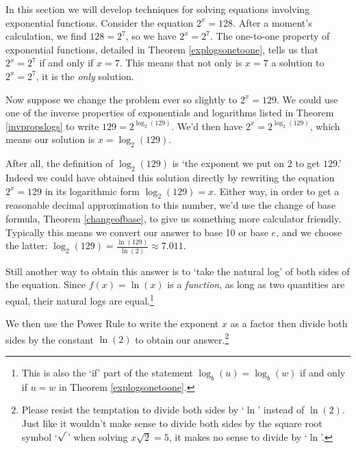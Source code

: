 

\setcounter{footnote}{0}

\label{ExponentialEquationsandInequalities}

In this section we will develop techniques for solving equations involving exponential functions.  Consider the equation $2^{x} = 128$.  After a moment's calculation, we find $128 = 2^{7}$, so we have $2^{x} = 2^{7}$.  The one-to-one property of exponential functions, detailed in Theorem \ref{explogsonetoone}, tells us that $2^{x} = 2^{7}$ if and only if $x=7$.  This means that not only is $x=7$ a solution to $2^{x} = 2^{7}$, it is the \textit{only} solution.  

\smallskip

Now suppose we change the problem ever so slightly to $2^{x} = 129$.  We could use one of the inverse properties of exponentials and logarithms listed in Theorem \ref{invpropslogs} to write $129 = 2^{\log_{2}(129)}$.  We'd then have $2^{x} = 2^{\log_{2}(129)}$, which means our solution is $x = \log_{2}(129)$. 

\smallskip

After all, the definition of $\log_{2}(129)$ is `the exponent we put on $2$ to get $129$.' Indeed we could have obtained this solution directly by rewriting the equation $2^{x} = 129$ in its logarithmic form $\log_{2}(129) = x$.  Either way, in order to get a reasonable decimal approximation to this number, we'd use the change of base formula, Theorem \ref{changeofbase}, to give us something more calculator friendly.  Typically this means we convert our answer to base 10 or base $e$, and we choose the latter: $\log_{2}(129) = \frac{\ln(129)}{\ln(2)} \approx 7.011$.  

\smallskip

Still another way to obtain this answer is to `take the natural log' of both sides of the equation. Since $f(x) = \ln(x)$ is a \textit{function}, as long as two quantities are equal, their natural logs are equal.\footnote{This is also the `if' part of the statement $\log_{b}(u) = \log_{b}(w)$ if and only if $u=w$ in Theorem \ref{explogsonetoone}.} 

\smallskip

We then use the Power Rule to write the exponent $x$ as a factor then divide both sides by the constant $\ln(2)$ to obtain our answer.\footnote{ Please resist the temptation to divide both sides by `$\ln$' instead of $\ln(2)$.   Just like it wouldn't make sense to divide both sides by the square root symbol `$\sqrt{\vphantom{2} \,}$' when solving $x \sqrt{2} = 5$, it makes no sense to divide by `$\ln$'.}

